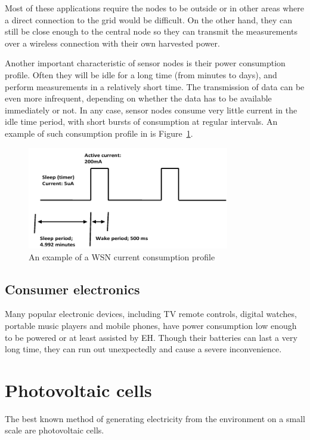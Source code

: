 \documentclass[a4paper,10pt]{article}
\begin{document}
Most of these applications require the nodes to be outside or in other areas where a direct connection to the grid would be difficult. On the other hand, they can still be close enough to the central node so they can transmit the measurements over a wireless connection with their own harvested power. 

Another important characteristic of sensor nodes is their power consumption profile. Often they will be idle for a long time (from minutes to days), and perform measurements in a relatively short time. The transmission of data can be even more infrequent, depending on whether the data has to be available immediately or not. In any case, sensor nodes consume very little current in the idle time period, with short bursts of consumption at regular intervals. An example of such consumption profile in is Figure~\ref{fig:wsn-consumption}. 

\begin{figure}[h]
\centering
 \includegraphics[width=250pt]{./Slike/wsn-current-profile}
 \caption{An example of a \ac{WSN} current consumption profile~\cite{cap-wsn-ieee}}
\label{fig:wsn-consumption}
\end{figure}


\subsection{Consumer electronics}

Many popular electronic devices, including TV remote controls, digital watches, portable music players and mobile phones, have power consumption low enough to be powered or at least assisted by \ac{EH}. Though their batteries can last a very long time, they can run out unexpectedly and cause a severe inconvenience. 

\section{Photovoltaic cells}

The best known method of generating electricity from the environment on a small scale are photovoltaic cells. 
\end{document}
